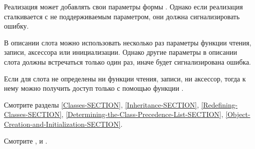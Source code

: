 \begin{defmac}
Реализация может добавлять свои параметры формы .
Однако если реализация сталкивается с не поддерживаемым параметром, они должна
сигнализировать ошибку.

В описании слота можно использовать несколько раз параметры функции чтения,
записи, аксессора или инициализации. Однако другие параметры в описании слота
должны встречаться только один раз, иначе будет сигнализирована ошибка.

Если для слота не определены ни функции чтения, записи, ни аксессор, тогда к
нему можно получить доступ только с помощью функции .

Смотрите разделы \ref{Classes-SECTION},
\ref{Inheritance-SECTION},
\ref{Redefining-Classes-SECTION},
\ref{Determining-the-Class-Precedence-List-SECTION},
\ref{Object-Creation-and-Initialization-SECTION}.

Смотрите ,
 и 
.
\end{defmac}

